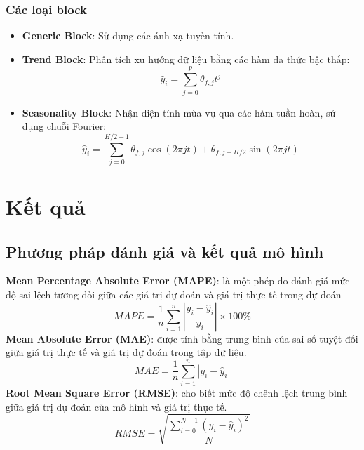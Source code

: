 \documentclass[conference]{IEEEtran}
\begin{document}
\subsubsection{Các loại block}
\begin{itemize}
    \item \textbf{Generic Block}: Sử dụng các ánh xạ tuyến tính.
    \item \textbf{Trend Block}: Phân tích xu hướng dữ liệu bằng các hàm đa thức bậc thấp:
          \[
              \hat{y}_i = \sum_{j=0}^{p} \theta_{f,j} t^j
          \]
    \item \textbf{Seasonality Block}: Nhận diện tính mùa vụ qua các hàm tuần hoàn, sử dụng chuỗi Fourier:
          \[
              \hat{y}_i = \sum_{j=0}^{H/2 - 1} \theta_{f,j} \cos(2\pi j t) + \theta_{f,j + H/2} \sin(2\pi j t)
          \]
\end{itemize}

\section{Kết quả}
\subsection{Phương pháp đánh giá và kết quả mô hình}
\textbf{Mean Percentage Absolute Error (MAPE)}: là một phép đo đánh giá mức độ sai lệch tương đối giữa các giá trị dự đoán và giá trị thực tế trong dự đoán
\[
    MAPE = \frac{1}{n} \sum_{i=1}^{n} \left| \frac{y_i - \hat{y}_i}{y_i} \right| \times 100\%
\]
\textbf{Mean Absolute Error (MAE)}: được tính bằng trung bình của sai số tuyệt đối giữa giá trị thực tế và giá trị dự đoán trong tập dữ liệu.
\[
    MAE = \frac{1}{n}\sum_{i=1}^{n}\left|y_i-{\hat{y}}_i\right|
\]
\textbf{Root Mean Square Error (RMSE)}: cho biết mức độ chênh lệch trung bình giữa giá trị dự đoán của mô hình và giá trị thực tế.
\[
    RMSE = \sqrt{\frac{\sum_{i=0}^{N - 1} (y_i - \hat{y}_i)^2}{N}}
\]
\end{document}
